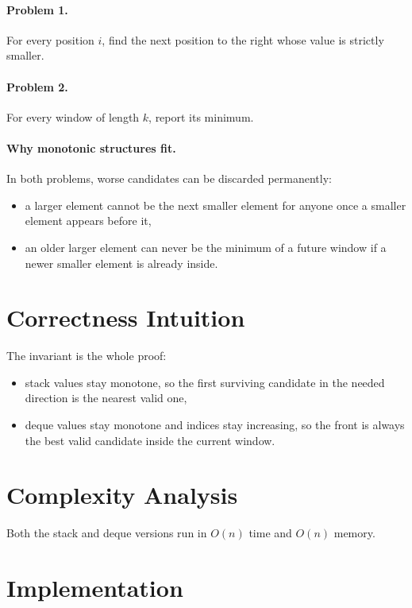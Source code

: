 \paragraph{Problem 1.}
For every position \(i\), find the next position to the right whose value is strictly smaller.

\paragraph{Problem 2.}
For every window of length \(k\), report its minimum.

\paragraph{Why monotonic structures fit.}
In both problems, worse candidates can be discarded permanently:

\begin{itemize}
  \item a larger element cannot be the next smaller element for anyone once a smaller element appears before it,
  \item an older larger element can never be the minimum of a future window if a newer smaller element is already inside.
\end{itemize}

\section*{Correctness Intuition}

The invariant is the whole proof:

\begin{itemize}
  \item stack values stay monotone, so the first surviving candidate in the needed direction is the nearest valid one,
  \item deque values stay monotone and indices stay increasing, so the front is always the best valid candidate inside
  the current window.
\end{itemize}

\section*{Complexity Analysis}

Both the stack and deque versions run in \(O(n)\) time and \(O(n)\) memory.

\section*{Implementation}

